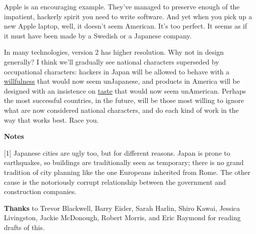 Apple is an encouraging
                  example. They've managed to preserve enough of the impatient,
                  hackerly spirit you need to write software. And yet when you
                  pick up a new Apple laptop, well, it doesn't seem American.
                  It's too perfect. It seems as if it must have been made by a
                  Swedish or a Japanese company.

In many
                  technologies, version 2 has higher resolution. Why not in
                  design generally? I think we'll gradually see national
                  characters superseded by occupational characters: hackers in
                  Japan will be allowed to behave with a
                  \href{http://www.paulgraham.com/gba.html}{willfulness} that would now seem
                  unJapanese, and products in America will be designed with an
                  insistence on \href{http://www.paulgraham.com/taste.html}{taste} that would now
                  seem unAmerican. Perhaps the most successful countries, in the
                  future, will be those most willing to ignore what are now
                  considered national characters, and do each kind of work in
                  the way that works best. Race you.



\textbf{Notes}

[1] Japanese cities are ugly too, but for
                  different reasons. Japan is prone to earthquakes, so buildings
                  are traditionally seen as temporary; there is no grand
                  tradition of city planning like the one Europeans inherited
                  from Rome. The other cause is the notoriously corrupt
                  relationship between the government and construction
                  companies.

\textbf{Thanks} to Trevor Blackwell, Barry
                  Eisler, Sarah Harlin, Shiro Kawai, Jessica Livingston, Jackie
                  McDonough, Robert Morris, and Eric Raymond for reading drafts
                  of this.



              
            
          
